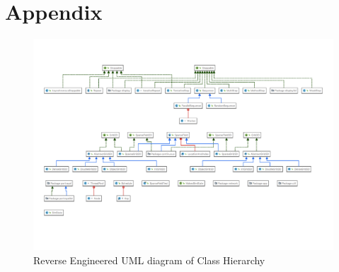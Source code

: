 \documentclass[11pt]{article}
\begin{document}
	


\newpage
\raggedright
{}

\newpage
\section{Appendix}
\begin{figure}[htp]
\centering
\includegraphics[width=\textwidth]{Appendix/UML}
\caption{Reverse Engineered UML diagram of Class Hierarchy}
\label{fig:uml}
\end{figure}
\end{document}
